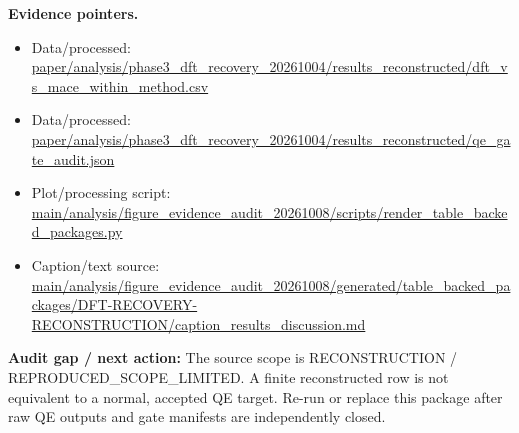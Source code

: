 \documentclass[10pt]{article}
\newcommand{\statusline}[1]{\colorbox{gray!12}{\parbox{0.96\linewidth}{#1}}}
\begin{document}
\textbf{Evidence pointers.}
\begin{itemize}[leftmargin=1.4em,noitemsep]
\item Data/processed: \begingroup\scriptsize\url{paper/analysis/phase3_dft_recovery_20261004/results_reconstructed/dft_vs_mace_within_method.csv}\endgroup
\item Data/processed: \begingroup\scriptsize\url{paper/analysis/phase3_dft_recovery_20261004/results_reconstructed/qe_gate_audit.json}\endgroup
\item Plot/processing script: \begingroup\scriptsize\url{main/analysis/figure_evidence_audit_20261008/scripts/render_table_backed_packages.py}\endgroup
\item Caption/text source: \begingroup\scriptsize\url{main/analysis/figure_evidence_audit_20261008/generated/table_backed_packages/DFT-RECOVERY-RECONSTRUCTION/caption_results_discussion.md}\endgroup
\end{itemize}
\statusline{\textbf{Audit gap / next action:} The source scope is RECONSTRUCTION / REPRODUCED\_SCOPE\_LIMITED. A finite reconstructed row is not equivalent to a normal, accepted QE target. Re-run or replace this package after raw QE outputs and gate manifests are independently closed.}
\vfill
\clearpage
\end{document}
